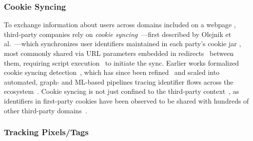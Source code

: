 \subsubsection{Cookie Syncing}
\label{sec:stateful-techniques-cookie-syncing}
To exchange information about users across domains included on a webpage \symInclusion, third-party companies rely on \textit{cookie syncing}~\cite{acarWebNeverForgets2014}---first described by Olejnik et al.~\cite{olejnikSellingPrivacyAuction2014}---which synchronizes user identifiers maintained in each party's cookie jar \symStorage, most commonly shared via URL parameters embedded in redirects \symSharing\ between them, requiring script execution \symExecution\ to initiate the sync.
%
Earlier works formalized cookie syncing detection~\cite{acarWebNeverForgets2014,englehardtOnlineTracking1millionsite2016,bashirTracingInformationFlows2016}, which has since been refined~\cite{papadopoulosCookieSynchronizationEverything2019} and scaled into automated, graph- and ML-based pipelines tracing identifier flows across the ecosystem~\cite{papadopoulosCookieSynchronizationEverything2019, iqbalKhaleesiBreakerAdvertising2022}.
%
Cookie syncing is not just confined to the third-party context~\cite{sanchez-rolaJourneyCenterCookie2021}, as identifiers in first-party cookies have been observed to be shared with hundreds of other third-party domains~\cite{munirCookieGraphUnderstandingDetecting2023,bahramiCOOKIEGUARDCharacterizingIsolating2024}.



\subsubsection{Tracking Pixels/Tags}
\label{sec:stateful-techniques-tags}

